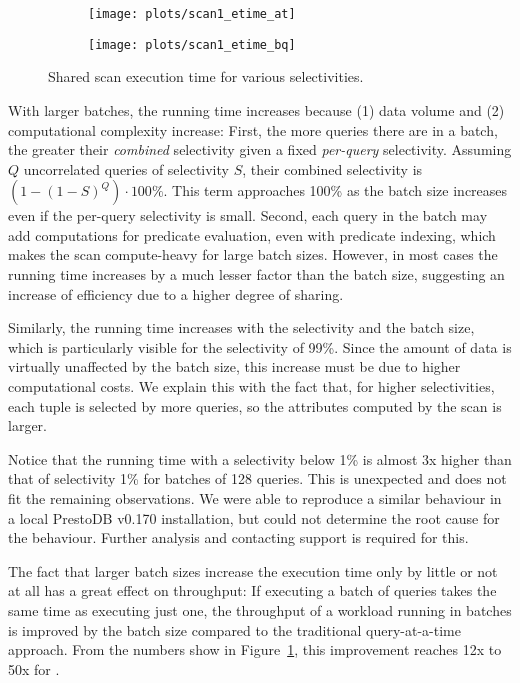 \begin{figure*}[bt]
    \centering
    \begin{subfigure}{.5\textwidth}
      \centering
      \texttt{[image: plots/scan1\_etime\_at]}
      \caption{\athena}
      \label{fig:exp:sscans:exp1:sel:at}
    \end{subfigure}%
    \begin{subfigure}{.5\textwidth}
      \centering
      \texttt{[image: plots/scan1\_etime\_bq]}
      \caption{\bigquery}
      \label{fig:exp:sscans:exp1:sel:bq}
    \end{subfigure}
    \caption{Shared scan execution time for various selectivities.}
    \label{fig:exp:sscans:exp1:sel}
\end{figure*}

With larger batches,
the running time increases
because (1) data volume and (2) computational complexity increase:
First, the more queries there are in a batch,
the greater their \emph{combined} selectivity
given a fixed \emph{per-query} selectivity.
Assuming $Q$ uncorrelated queries of selectivity $S$,
their combined selectivity is $(1 - (1 - S)^Q ) \cdot 100\% $.
This term approaches 100\% as the batch size increases
even if the per-query selectivity is small.
Second, each query in the batch may add computations for predicate evaluation,
even with predicate indexing,
which makes the scan compute-heavy for large batch sizes.
However, in most cases the running time increases
by a much lesser factor than the batch size,
suggesting an increase of efficiency due to a higher degree of sharing.

Similarly, the running time increases with the selectivity and the batch size,
which is particularly visible for the selectivity of 99\%.
Since the amount of data is virtually unaffected by the batch size,
this increase must be due to higher computational costs.
We explain this with the fact that,
for higher selectivities, each tuple is selected by more queries,
so the \qset attributes computed by the scan is larger.

Notice that the running time with a selectivity below 1\%
is almost 3x higher than that of selectivity 1\% for batches of 128 queries.
This is unexpected and does not fit the remaining observations.
We were able to reproduce a similar behaviour
in a local PrestoDB v0.170 installation,
but could not determine the root cause for the behaviour.
Further analysis and contacting support is required for this.

The fact that larger batch sizes
increase the execution time only by little or not at all
has a great effect on throughput:
If executing a batch of queries takes the same time as executing just one,
the throughput of a workload running in batches
is improved by the batch size
compared to the traditional query-at-a-time approach.
From the numbers show in Figure~\ref{fig:exp:sscans:exp1:sel:at},
this improvement reaches 12x to 50x for \athena.

